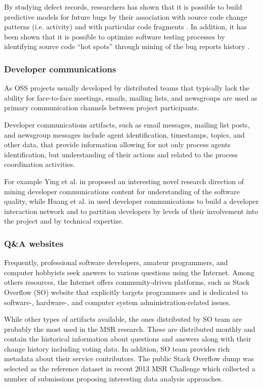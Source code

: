 By studying defect records, researchers has shown that it is possible to build predictive models for future bugs by their association 
with source code change patterns \cite{citeulike:6055293} (i.e. activity) and with particular code fragments \cite{citeulike:393158}. 
In addition, it has been shown that it is possible to optimize software testing processes by identifying source code 
``hot spots'' through mining of the bug reports history \cite{ostrand2004tool}.

\subsubsection{Developer communications}
As OSS projects usually developed by distributed teams that typically lack the ability for face-to-face meetings, 
emails, mailing lists, and newsgroups are used as primary communication channels between project participants. 

Developer communications artifacts, such as email messages, mailing list posts, and newsgroup messages include 
agent identification, timestamps, topics, and other data, that provide information allowing for not only process agents 
identification, but understanding of their actions and related to the process coordination activities. 


For example Ying et al. in \cite{citeulike:1366052} proposed an interesting novel research direction of mining developer 
communications content for understanding of the software quality, while Huang et al. in \cite{citeulike:9495129} used developer 
communications to build a developer interaction network and to partition developers by levels of their involvement into the 
project and by technical expertize.

\subsubsection{Q\&A websites}
Frequently, professional software developers, amateur programmers, and computer hobbyists seek answers to various questions 
using the Internet. 
Among others resources, the Internet offers com\-munity-driven platforms, such as Stack Overflow (SO) website that explicitly 
targets programmers and is dedicated to software-, hardware-, and computer system administration-related issues.

While other types of artifacts available, the ones distributed by SO team are probably the most used in the MSR research. 
These are distributed monthly and contain the historical information about questions and answers along with their change 
history including voting data. In addition, SO team provides rich metadata about their service contributors. 
The public Stack Overflow dump was selected as the reference dataset in recent 2013 MSR Challenge \cite{MSRChallenge2013} 
which collected a number of submissions proposing interesting data analysis approaches.

